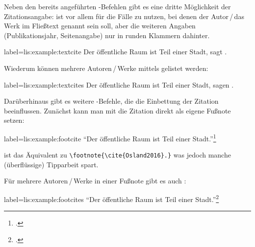 Neben den bereits angeführten -Befehlen gibt es eine dritte Möglichkeit der Zitationsangabe:
 ist vor allem für die Fälle zu nutzen, 
bei denen der Autor\,/\,das Werk im Fließtext genannt sein soll, 
aber die weiteren Angaben (Publikationsjahr, Seitenangabe) nur in runden Klammern dahinter.

\begin{lfgwexample}{label={lis:example:textcite}}
Der öffentliche Raum ist Teil einer Stadt, sagt \textcite{Osland2016}.
\end{lfgwexample}

Wiederum können mehrere Autoren\,/\,Werke mittels  gelistet werden:
\begin{lfgwexample}{label={lis:example:textcites}}
Der öffentliche Raum ist Teil einer Stadt, sagen \textcites{Osland2016}
[vgl.][]{Evangelidis2014}.
\end{lfgwexample}

Darüberhinaus gibt es weitere -Befehle, 
die die Einbettung der Zitation beeinflussen. 
Zunächst kann man mit  die Zitation direkt als eigene Fußnote setzen:
\begin{lfgwexample}{label={lis:example:footcite}}
\enquote{Der öffentliche Raum ist Teil einer Stadt.}\footcite{Osland2016}
\end{lfgwexample}
 ist das Äquivalent zu \lstinline/\footnote{\cite{Osland2016}.}/
was jedoch manche (überflüssige) Tipparbeit spart.

Für mehrere Autoren\,/\,Werke in einer Fußnote gibt es auch :
\begin{lfgwexample}{label={lis:example:footcites}}
\enquote{Der öffentliche Raum ist Teil einer Stadt.}\footcites(s.)(){Osland2016}
[vgl.][]{Evangelidis2014}
\end{lfgwexample}
 
